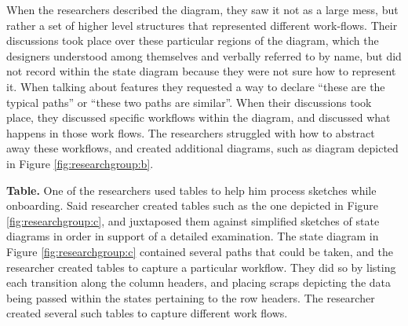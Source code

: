 
When the researchers described the diagram, they saw it not as a large mess, but rather a set of higher level structures that represented different work-flows. Their discussions took place over these particular regions of the diagram, which the designers understood among themselves and verbally referred to by name, but did not record within the state diagram because they were not sure how to represent it. When talking about features they requested a way to declare ``these are the typical paths'' or ``these two paths are similar''. When their discussions took place, they discussed specific workflows within the diagram, and discussed what happens in those work flows. The researchers struggled with how to abstract away these workflows, and created additional diagrams, such as diagram depicted in Figure \ref{fig:researchgroup:b}.




\textbf{Table. } One of the researchers used tables to help him process sketches while onboarding. Said researcher created tables such as the one depicted in Figure \ref{fig:researchgroup:c}, and juxtaposed them against simplified sketches of state diagrams in order in support of a detailed examination. The state diagram in Figure \ref{fig:researchgroup:c} contained several paths that could be taken, and the researcher created tables to capture a particular workflow. They did so by listing each transition along the column headers, and placing scraps depicting the data being passed within the states pertaining to the row headers. The researcher created several such tables to capture different work flows.

